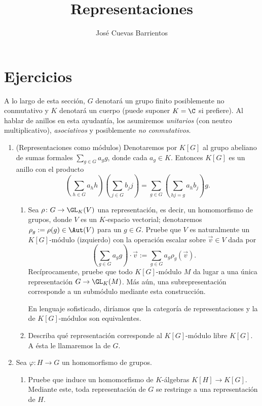 \documentclass[11pt, reqno]{amsart}
\title{Representaciones}
\date{\DTMdate{2025-09-24}}
\author{José Cuevas Barrientos}
\begin{document}
\maketitle

\section{Ejercicios}
A lo largo de esta sección, $G$ denotará un grupo finito posiblemente no conmutativo y $K$ denotará un cuerpo
(puede suponer $K = \C$ si prefiere).
Al hablar de anillos en esta ayudantía, los asumiremos \emph{unitarios} (con neutro multiplicativo), \emph{asociativos}
y posiblemente \emph{no conmutativos}.

\begin{enumerate}
	\item (Representaciones como módulos)
		Denotaremos por $K[G]$ al grupo abeliano de sumas formales $\sum_{g\in G} a_g g$, donde cada $a_g \in K$.
		Entonces $K[G]$ es un anillo con el producto
		\[
			\left( \sum_{h\in G} a_h h \right)\left( \sum_{j\in G} b_j j \right)
			= \sum_{g\in G} \left( \sum_{hj=g} a_hb_j \right) g.
		\]
		\begin{enumerate}
			\item Sea $\rho \colon G \to \GL_K(V)$ una representación, es decir, un homomorfismo de grupos, donde
				$V$ es un $K$-espacio vectorial; denotaremos $\rho_g := \rho(g) \in \Aut(V)$ para un $g \in G$.
				Pruebe que $V$ es naturalmente un $K[G]$-módulo (izquierdo) con la operación escalar sobre $\vec v \in V$
				dada por
				\[
					\left( \sum_{g\in G} a_g g \right)\cdot\vec v := \sum_{g\in G} a_g \rho_g(\vec v).
				\]
				Recíprocamente, pruebe que todo $K[G]$-módulo $M$ da lugar a una única representación $G \to
				\GL_K(M)$.
				Más aún, una subrepresentación corresponde a un submódulo mediante esta construcción.

				\lookup
				En lenguaje sofisticado, diríamos que la categoría de representaciones y la de $K[G]$-módulos son
				equivalentes.

			\item Describa qué representación corresponde al $K[G]$-módulo libre $K[G]$.
				A ésta le llamaremos la  de $G$.
		\end{enumerate}

		\newex
	\item Sea $\varphi \colon H \to G$ un homomorfismo de grupos.
		\begin{enumerate}
			\item Pruebe que induce un homomorfismo de $K$-álgebras $K[H] \to K[G]$.
				Mediante este, toda representación de $G$ se restringe a una representación de $H$.


\end{enumerate}
\end{enumerate}
\end{document}
